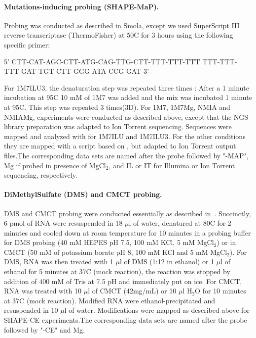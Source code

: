 \documentclass[a4,center,fleqn]{NAR}
\begin{document}
\paragraph{Mutations-inducing probing (SHAPE-MaP).}
Probing was conducted as described in Smola\etal\cite{Smola2015}, except we used SuperScript III reverse transcriptase (ThermoFisher) at 50\degree{}C for 3 hours using the following specific primer: 

{\centering {}%
5' CTT-CAT-AGC-CTT-ATG-CAG-TTG-CTT-TTT-TTT-TTT
   TTT-TTT-TTT-GAT-TGT-CTT-GGG-ATA-CCG-GAT 3'\\}

For 1M7ILU3, the denaturation step was repeated three times : After a 1 minute incubation at 95\degree{}C 10 mM of 1M7 was added and the mix was incubated 1 minute at 95\degree{}C. This step was repeated 3 times(3D). For 1M7, 1M7Mg, NMIA and NMIAMg, experiments were conducted as described above, except that the NGS library preparation was adapted to Ion Torrent sequencing. Sequences were mapped and analyzed with  for 1M7ILU and 1M7ILU3. For the other conditions they are mapped with a script based on , but adapted to Ion Torrent output files.The corresponding data sets are named after the probe followed by "-MAP", Mg if probed in presence of MgCl$_\text{2}$, and IL  or IT for Illumina or Ion Torrent sequencing, respectively. 


\paragraph{DiMethylSulfate (DMS) and CMCT probing.}
DMS and CMCT probing were conducted essentially as described in~\cite{Weill2004,James2008}. Succinctly, 6 pmol of RNA were resuspended in 18 $\mu$l of water, denatured at 80\degree{}C for 2 minutes and cooled down at room temperature for 10 minutes in a probing buffer for DMS probing (40 mM HEPES pH 7.5, 100 mM KCl, 5 mM MgCl$_\text{2}$) or in CMCT (50 mM of potassium borate pH 8, 100 mM KCl and 5 mM MgCl$_\text{2}$). For DMS, RNA was then treated with 1 $\mu$l of DMS (1:12 in ethanol) or 1 $\mu$l of ethanol for 5 minutes at 37\degree{}C (mock reaction), the reaction was stopped by addition of 400 mM of Tris at 7.5 pH and immediately put on ice. For CMCT,  RNA was treated with 10 $\mu$l of CMCT (42mg/mL) or 10 $\mu$l H$_\text{2}$O for 10 minutes at 37\degree{}C (mock reaction). Modified RNA were ethanol-precipitated and resuspended in 10 $\mu$l of water. Modifications were mapped as described above for SHAPE-CE experiments.The corresponding data sets are named after the probe followed by "-CE" and Mg.
\end{document}
